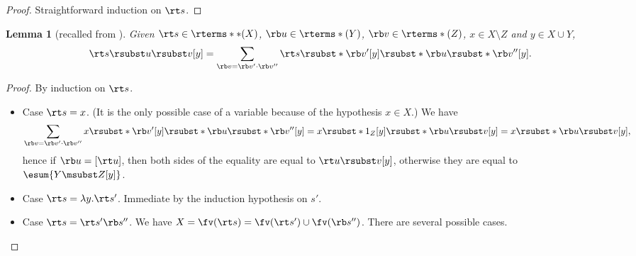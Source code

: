 \documentclass[10pt,a4paper]{amsart}
\newtheorem{lemma}[theorem]{Lemma}
\theoremstyle{definition}
\begin{document}
	\begin{proof}
	Straightforward induction on $\rt s$.
	\end{proof}

\begin{lemma}[recalled from ]
	Given $\rt s \in \rterms**(X)$,
	$\rb u \in \rterms*(Y)$,
	$\rb v \in \rterms*(Z)$,
	$x \in X \setminus Z$ and $y \in X \cup Y$,
	\[	\rt s \rsubst u \rsubst v [y] =
		\sum_{\rb v = \rb v' \cdot \rb v''} \rt s \rsubst* {\rb v'} [y]
		\rsubst*{ \rb u \rsubst* {\rb v''}[y] }. \]
\end{lemma}
	
	\begin{proof}
	By induction on $\rt s$.
	\begin{itemize}
	\item Case $\rt s = x$.
		(It is the only possible case of a variable
		because of the hypothesis $x \in X$.)
		We have
		\[	\sum_{\rb v = \rb v' \cdot \rb v''} x \rsubst* {\rb v'} [y]
				\rsubst*{ \rb u \rsubst* {\rb v''}[y] }
			= x \rsubst* {1_Z}[y] \rsubst*{\rb u \rsubst v[y]}
			= x \rsubst*{\rb u \rsubst v[y]}, \]
		hence if $\rb u = [\rt u]$, then
		both sides of the equality are equal to $\rt u \rsubst v[y]$,
		otherwise they are equal to $\esum{Y \msubst Z [y]}$.
	\item Case $\rt s = \ensuremath{\lambda}y.\rt s'$.
		Immediate by the induction hypothesis on $s'$.
	\item Case $\rt s = \rt s' \rb s''$.
		We have $X = \fv(\rt s) = \fv(\rt s') \cup \fv(\rb s'')$.
		There are several possible cases.

\end{itemize}
\end{proof}
\end{document}

